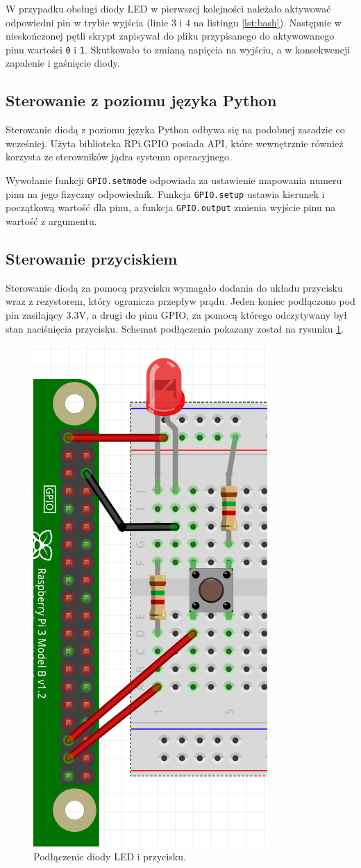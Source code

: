 \documentclass[12pt]{article}
\begin{document}
W przypadku obsługi diody LED w pierwszej kolejności należało aktywować odpowiedni pin w trybie wyjścia (linie 3 i 4 na listingu \ref{lst:bash}). Następnie w nieskończonej pętli skrypt zapisywał do pliku przypisanego do aktywowanego pinu wartości \lstinline{0} i \lstinline{1}. Skutkowało to zmianą napięcia na wyjściu, a w konsekwencji zapalenie i gaśnięcie diody.


\subsection{Sterowanie z poziomu języka Python}
Sterowanie diodą z poziomu języka Python odbywa się na podobnej zasadzie co wcześniej. Użyta biblioteka RPi.GPIO posiada API, które wewnętrznie również korzysta ze sterowników jądra systemu operacyjnego. 


Wywołanie funkcji \lstinline{GPIO.setmode} odpowiada za ustawienie mapowania numeru pinu na jego fizyczny odpowiednik. Funkcja \lstinline{GPIO.setup} ustawia kierunek i początkową wartość dla pinu, a funkcja \lstinline{GPIO.output} zmienia wyjście pinu na wartość z argumentu.
\newpage
\subsection{Sterowanie przyciskiem}

Sterowanie diodą za pomocą przycisku wymagało dodania do układu przycisku wraz z rezystorem, który ogranicza przepływ prądu. Jeden koniec podłączono pod pin zasilający 3.3V, a drugi do pinu GPIO, za pomocą którego odczytywany był stan naciśnięcia przycisku. Schemat podłączenia pokazany został na rysunku \ref{sch:2}.

\begin{figure}[h]
  \centering
  \includegraphics[height=0.4\linewidth]{sch2}
  \caption{Podłączenie diody LED i przycisku.}
  \label{sch:2}
\end{figure}
\end{document}
